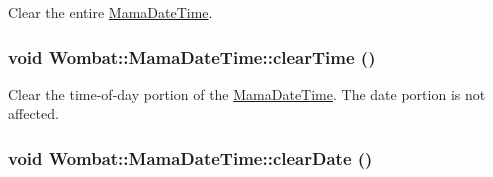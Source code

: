Clear the entire \hyperlink{classWombat_1_1MamaDateTime}{MamaDateTime}. \hypertarget{classWombat_1_1MamaDateTime_a9399de71fe3c26fa8c1c94b8279195bb}{
\subsubsection[{clearTime}]{\setlength{\rightskip}{0pt plus 5cm}void Wombat::MamaDateTime::clearTime ()}}
\label{classWombat_1_1MamaDateTime_a9399de71fe3c26fa8c1c94b8279195bb}


Clear the time-\/of-\/day portion of the \hyperlink{classWombat_1_1MamaDateTime}{MamaDateTime}. The date portion is not affected. \hypertarget{classWombat_1_1MamaDateTime_a8e6693500b38915d68afb54b4ad3dc9b}{
\subsubsection[{clearDate}]{\setlength{\rightskip}{0pt plus 5cm}void Wombat::MamaDateTime::clearDate ()}}
\label{classWombat_1_1MamaDateTime_a8e6693500b38915d68afb54b4ad3dc9b}


